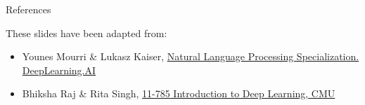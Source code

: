 \begin{frame}{References}
  \begin{flushleft}
    These slides have been adapted from:
    \begin{itemize}
      \item[$\blacktriangleright$] Younes Mourri \& Lukasz Kaiser,
        \href{https://www.deeplearning.ai/courses/natural-language-processing-specialization/}{Natural Language Processing Specialization. DeepLearning.AI}
      \item[$\blacktriangleright$] Bhiksha Raj \& Rita Singh,
        \href{https://deeplearning.cs.cmu.edu/}{11-785 Introduction to Deep Learning, CMU}
    \end{itemize}
  \end{flushleft}
\end{frame}

